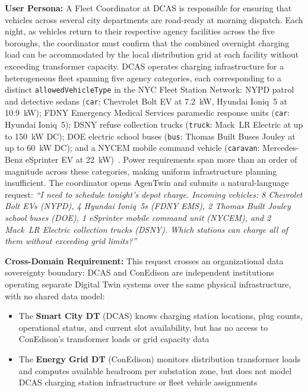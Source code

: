 \textbf{User Persona:}
A Fleet Coordinator at DCAS is responsible for ensuring that vehicles across several
    city departments are road-ready at morning dispatch.
Each night, as vehicles return to their respective agency facilities across the five boroughs,
    the coordinator must confirm that the combined overnight charging load can be accommodated
    by the local distribution grid at each facility without exceeding transformer capacity.
DCAS operates charging infrastructure for a heterogeneous fleet spanning five agency categories,
    each corresponding to a distinct \texttt{allowedVehicleType} in the NYC Fleet Station Network:
    NYPD patrol and detective sedans (\texttt{car}:
        Chevrolet Bolt EV at 7.2~kW, Hyundai Ioniq~5 at 10.9~kW);
    FDNY Emergency Medical Services paramedic response units (\texttt{car}:
        Hyundai Ioniq~5);
    DSNY refuse collection trucks (\texttt{truck}:
        Mack~LR Electric at up to 150~kW DC);
    DOE electric school buses (\texttt{bus}:
        Thomas Built Buses Jouley at up to 60~kW DC);
    and a NYCEM mobile command vehicle (\texttt{caravan}:
        Mercedes-Benz eSprinter EV at 22~kW)~\cite{dcas2026cftp}.
Power requirements span more than an order of magnitude across these categories,
    making uniform infrastructure planning insufficient.
The coordinator opens AgenTwin and submits a natural-language request:
    \textit{``I need to schedule tonight's depot charge.
    Incoming vehicles: 8 Chevrolet Bolt EVs (NYPD), 4 Hyundai Ioniq~5s (FDNY EMS),
    2 Thomas Built Jouley school buses (DOE), 1 eSprinter mobile command unit (NYCEM),
    and 2 Mack~LR Electric collection trucks (DSNY).
    Which stations can charge all of them without exceeding grid limits?''}

\textbf{Cross-Domain Requirement:}
This request crosses an organizational data sovereignty boundary:
    DCAS and ConEdison are independent institutions operating separate Digital Twin systems
    over the same physical infrastructure,
    with no shared data model:

\begin{itemize}
    \item The \textbf{Smart City DT} (DCAS) knows charging station locations,
        plug counts, operational status, and current slot availability,
        but has no access to ConEdison's transformer loads or grid capacity data
    \item The \textbf{Energy Grid DT} (ConEdison) monitors distribution transformer loads
        and computes available headroom per substation zone,
        but does not model DCAS charging station infrastructure or fleet vehicle assignments
\end{itemize}

